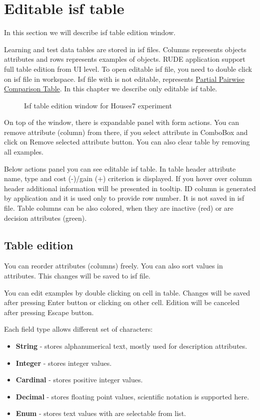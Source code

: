 \section{Editable isf table}\label{section:isf-table}

In this section we will describe isf table edition window.

Learning and test data tables are stored in isf files. Columns represents objects attributes and rows represents examples of objects. RUDE application support full table edition from UI level. To open editable isf file, you need to double click on isf file in workspace. Isf file with is not editable, represents \hyperref[sub:pct-isf]{Partial Pairwise Comparison Table}. In this chapter we describe only editable isf table.

\begin{figure*}[!ht] 
	\centering
	\caption{Isf table edition window for Houses7 experiment}
\end{figure*}

On top of the window, there is expandable panel with form actions.
You can remove attribute (column) from there, if you select attribute in ComboBox and click on Remove selected attribute button. You can also clear table by removing all examples.

Below actions panel you can see editable isf table. In table header attribute name, type and cost (-)/gain (+) criterion is displayed. If you hover over column header additional information will be presented in tooltip. ID column is generated by application and it is used only to provide row number. It is not saved in isf file. Table columns can be also colored, when they are inactive (red) or are decision attributes (green).

\subsection{Table edition}\label{sub:isf-examples}

You can reorder attributes (columns) freely. You can also sort values in attributes. This changes will be saved to isf file.

You can edit examples by double clicking on cell in table. Changes will be saved after pressing Enter button or clicking on other cell. Edition will be canceled after pressing Escape button.

Each field type allows different set of characters:
\begin{itemize}
	\item \textbf{String} - stores alphanumerical text, mostly used for description attributes.
	\item \textbf{Integer} - stores integer values.
	\item \textbf{Cardinal} - stores positive integer values.
	\item \textbf{Decimal} - stores floating point values, scientific notation is supported here.
	\item \textbf{Enum} - stores text values with are selectable from list.
\end{itemize}

